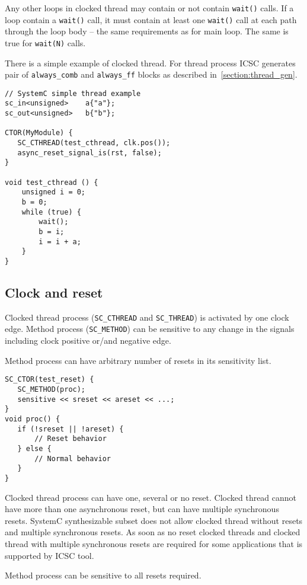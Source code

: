 Any other loops in clocked thread may contain or not contain {\tt wait()} calls. If a loop contain a {\tt wait()} call, it must contain at least one {\tt wait()} call at each path through the loop body -- the same requirements as for main loop.
The same is true for {\tt wait(N)} calls.

There is a simple example of clocked thread. For thread process ICSC generates pair of {\tt always\_comb} and {\tt always\_ff} blocks as described in~\ref{section:thread_gen}.

\begin{lstlisting}[style=mycpp]
// SystemC simple thread example
sc_in<unsigned>    a{"a"};
sc_out<unsigned>   b{"b"};
 
CTOR(MyModule) {
   SC_CTHREAD(test_cthread, clk.pos());
   async_reset_signal_is(rst, false);
}
 
void test_cthread () {
    unsigned i = 0;
    b = 0;
    while (true) {
        wait();
        b = i;
        i = i + a;
    }
}
\end{lstlisting}

\subsection{Clock and reset}

Clocked thread process ({\tt SC\_CTHREAD} and {\tt SC\_THREAD}) is activated by one clock edge. Method process ({\tt SC\_METHOD}) can be sensitive to any change in the signals including clock positive or/and negative edge.

Method process can have arbitrary number of resets in its sensitivity list. 
\begin{lstlisting}[style=mycpp]
SC_CTOR(test_reset) {
   SC_METHOD(proc);
   sensitive << sreset << areset << ...;       
}
void proc() {
   if (!sreset || !areset) {
       // Reset behavior
   } else {
       // Normal behavior
   }
}
\end{lstlisting}

Clocked thread process can have one, several or no reset. Clocked thread cannot have more than one asynchronous reset, but can have multiple synchronous resets. SystemC synthesizable subset does not allow clocked thread without resets and multiple synchronous resets. As soon as no reset clocked threads and clocked thread with multiple synchronous resets are required for some applications that is supported by ICSC tool. 

Method process can be sensitive to all resets required.

